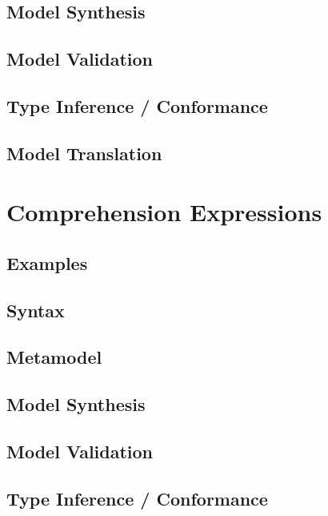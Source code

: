 \documentclass[a4paper,oneside,12pt, extrafontsizes]{memoir}
\begin{document}
    \section{Model Synthesis}

    \section{Model Validation}

    \section{Type Inference / Conformance}

    \section{Model Translation}

  \chapter{Comprehension Expressions}
  \label{ch:comprehensions}
  

    \section{Examples}
    

    \section{Syntax}
    

    \section{Metamodel}

    \section{Model Synthesis}

    \section{Model Validation}

    \section{Type Inference / Conformance}
\end{document}
